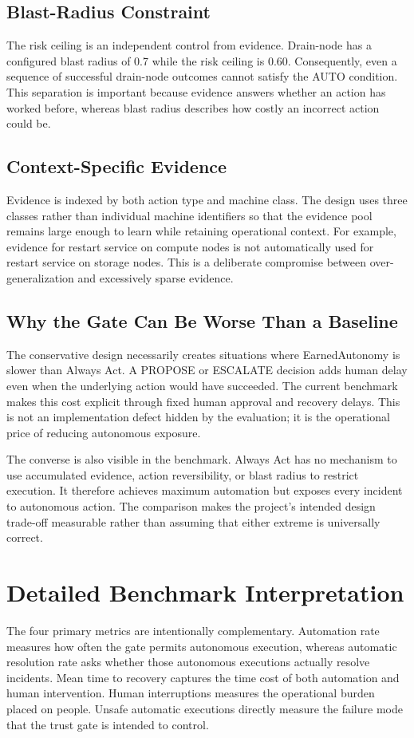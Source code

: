 \documentclass[conference]{IEEEtran}
\begin{document}
\subsection{Blast-Radius Constraint}
The risk ceiling is an independent control from evidence. Drain-node has a
configured blast radius of 0.7 while the risk ceiling is 0.60. Consequently,
even a sequence of successful drain-node outcomes cannot satisfy the AUTO
condition. This separation is important because evidence answers whether an
action has worked before, whereas blast radius describes how costly an incorrect
action could be.

\subsection{Context-Specific Evidence}
Evidence is indexed by both action type and machine class. The design uses
three classes rather than individual machine identifiers so that the evidence
pool remains large enough to learn while retaining operational context. For
example, evidence for restart service on compute nodes is not automatically
used for restart service on storage nodes. This is a deliberate compromise
between over-generalization and excessively sparse evidence.

\subsection{Why the Gate Can Be Worse Than a Baseline}
The conservative design necessarily creates situations where EarnedAutonomy is
slower than Always Act. A PROPOSE or ESCALATE decision adds human delay even
when the underlying action would have succeeded. The current benchmark makes
this cost explicit through fixed human approval and recovery delays. This is
not an implementation defect hidden by the evaluation; it is the operational
price of reducing autonomous exposure.

The converse is also visible in the benchmark. Always Act has no mechanism to
use accumulated evidence, action reversibility, or blast radius to restrict
execution. It therefore achieves maximum automation but exposes every incident
to autonomous action. The comparison makes the project's intended design
trade-off measurable rather than assuming that either extreme is universally
correct.

\section{Detailed Benchmark Interpretation}
The four primary metrics are intentionally complementary. Automation rate measures
how often the gate permits autonomous execution, whereas automatic resolution
rate asks whether those autonomous executions actually resolve incidents.
Mean time to recovery captures the time cost of both automation and human
intervention. Human interruptions measures the operational burden placed on
people. Unsafe automatic executions directly measure the failure mode that the
trust gate is intended to control.
\end{document}
